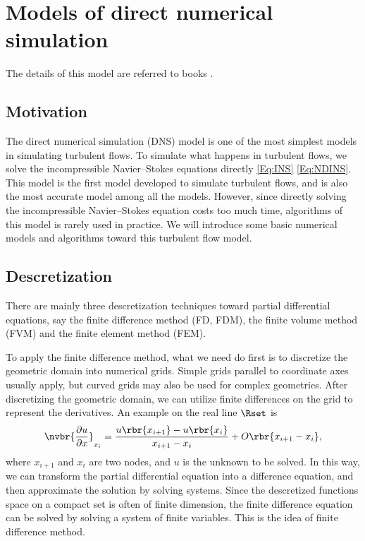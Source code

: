 \documentclass[english, nochinese]{pkupaper}
\begin{document}

\section{Models of direct numerical simulation} \label{Sec:DNS}

The details of this model are referred to books \parencite{forsythe_finite-difference_1960} \parencite{ferziger_computational_2002}.

\subsection{Motivation}

The direct numerical simulation (DNS) model is one of the most simplest models in simulating turbulent flows. To simulate what happens in turbulent flows, we solve the incompressible Navier--Stokes equations directly \eqref{Eq:INS} \eqref{Eq:NDINS}. This model is the first model developed to simulate turbulent flows, and is also the most accurate model among all the models. However, since directly solving the incompressible Navier--Stokes equation costs too much time, algorithms of this model is rarely used in practice. We will introduce some basic numerical models and algorithms toward this turbulent flow model.

\subsection{Descretization}

There are mainly three descretization techniques toward partial differential equations, say the finite difference method (FD, FDM), the finite volume method (FVM) and the finite element method (FEM).

To apply the finite difference method, what we need do first is to discretize the geometric domain into numerical grids. Simple grids parallel to coordinate axes usually apply, but curved grids may also be used for complex geometries. After discretizing the geometric domain, we can utilize finite differences on the grid to represent the derivatives. An example on the real line $\Rset$ is
\begin{equation}
\nvbr{\frac{\partial u}{\partial x}}_{x_i} = \frac{u\rbr{x_{i+1}} - u\rbr{x_i}}{x_{i+1} - x_i} + O \rbr{ x_{ i + 1 } - x_i },
\end{equation}
where $x_{i+1}$ and $x_i$ are two nodes, and $u$ is the unknown to be solved. In this way, we can transform the partial differential equation into a difference equation, and then approximate the solution by solving systems. Since the descretized functions space on a compact set is often of finite dimension, the finite difference equation can be solved by solving a system of finite variables. This is the idea of finite difference method.
\end{document}
